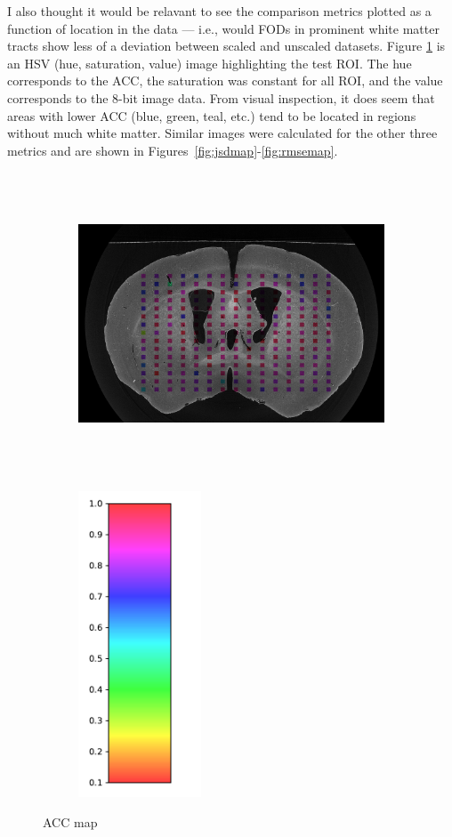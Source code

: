 \documentclass[11pt]{article}
\begin{document}
I also thought it would be relavant to see the comparison metrics plotted as a
function of location in the data --- i.e., would FODs in prominent white matter
tracts show less of a deviation between scaled and unscaled datasets. Figure
\ref{fig:accmap} is an HSV (hue, saturation, value) image highlighting the test
ROI. The hue corresponds to the ACC, the saturation was constant for all ROI,
and the value corresponds to the 8-bit image data. From visual inspection, it
does seem that areas with lower ACC (blue, green, teal, etc.) tend to be located
in regions without much white matter. Similar images were calculated for the
other three metrics and are shown in Figures~\ref{fig:jsdmap}-\ref{fig:rmsemap}.

\begin{figure}[h]
  \centering
  \hspace{-5em}
  \begin{subfigure}[b]{0.9\textwidth}
    \centering
    \includegraphics[height=9cm]{figs/acc}
  \end{subfigure}
  \hspace{-3em}
  \begin{subfigure}[b]{0.05\textwidth}
    \centering
    \includegraphics[height=9.1cm]{figs/cmap}
  \end{subfigure}
  \captionsetup{width=0.9\textwidth}
  \caption{ACC map}
  \label{fig:accmap}
\end{figure}
\end{document}
